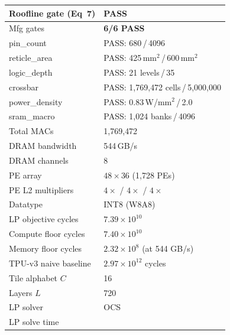 \begin{table}[h]
\begin{tabular}{@{}ll@{}}
Roofline gate (Eq~7)    & \textcolor{green!60!black}{\textbf{PASS}} \\
\midrule
Mfg gates               & \textcolor{green!60!black}{\textbf{6/6 PASS}} \\
\quad pin\_count         & PASS: 680\,/\,4096 \\
\quad reticle\_area      & PASS: 425\,mm$^2$\,/\,600\,mm$^2$ \\
\quad logic\_depth       & PASS: 21 levels\,/\,35 \\
\quad crossbar           & PASS: 1{,}769{,}472 cells\,/\,5{,}000{,}000 \\
\quad power\_density     & PASS: 0.83\,W/mm$^2$\,/\,2.0 \\
\quad sram\_macro        & PASS: 1{,}024 banks\,/\,4096 \\
\midrule
Total MACs              & 1{,}769{,}472 \\
DRAM bandwidth          & 544\,GB/s \\
DRAM channels           & 8 \\
PE array                & $48 \times 36$ (1{,}728 PEs) \\
PE L2 multipliers       & $4\times$ / $4\times$ / $4\times$ \\
Datatype                & INT8 (W8A8) \\
LP objective cycles     & $7.39 \times 10^{10}$ \\
Compute floor cycles    & $7.40 \times 10^{10}$ \\
Memory floor cycles     & $2.32 \times 10^{8}$ (at 544 GB/s) \\
TPU-v3 naive baseline   & $2.97 \times 10^{12}$ cycles \\
Tile alphabet $C$       & 16 \\
Layers $L$              & 720 \\
LP solver               & OCS \\
LP solve time           &  \\
\bottomrule
\end{tabular}
\end{table}


